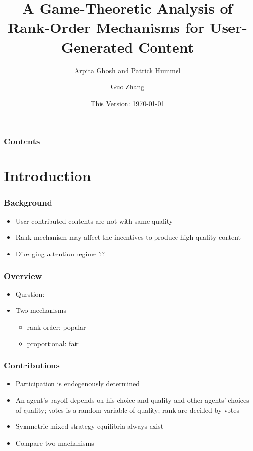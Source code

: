 \documentclass{beamer}
\title{A Game-Theoretic Analysis of Rank-Order Mechanisms for User-Generated Content}
\subtitle{Arpita Ghosh and Patrick Hummel}
\author{Guo Zhang}
\institute{WISE, Xiamen University}
\date{This Version: \today}
\begin{document}
\begin{frame}
\maketitle
\end{frame}

\begin{frame}[plain]
\frametitle{Contents}
\tableofcontents[hideallsubsections]
\end{frame}

\section{Introduction}
\begin{frame}
\frametitle{Background}
\begin{itemize}
\item User contributed contents are not with same quality
\item Rank mechanism may affect the incentives to produce high quality content
\item Diverging attention regime ??
\end{itemize}
\end{frame}

\begin{frame}
\frametitle{Overview}
\begin{itemize}
	\item Question: 
	\item Two mechanisms
	\begin{itemize}
		\item rank-order: popular
		\item proportional: fair
	\end{itemize}
\end{itemize}
\end{frame}

\begin{frame}
\frametitle{Contributions}
\begin{itemize}
	\item Participation is endogenously determined
	\item An agent's payoff depends on his choice and quality and other agents' choices of quality; votes is a random variable of quality; rank are decided by votes
	\item Symmetric mixed strategy equilibria always exist
	\item Compare two machanisms
\end{itemize}
\end{frame}
\end{document}
